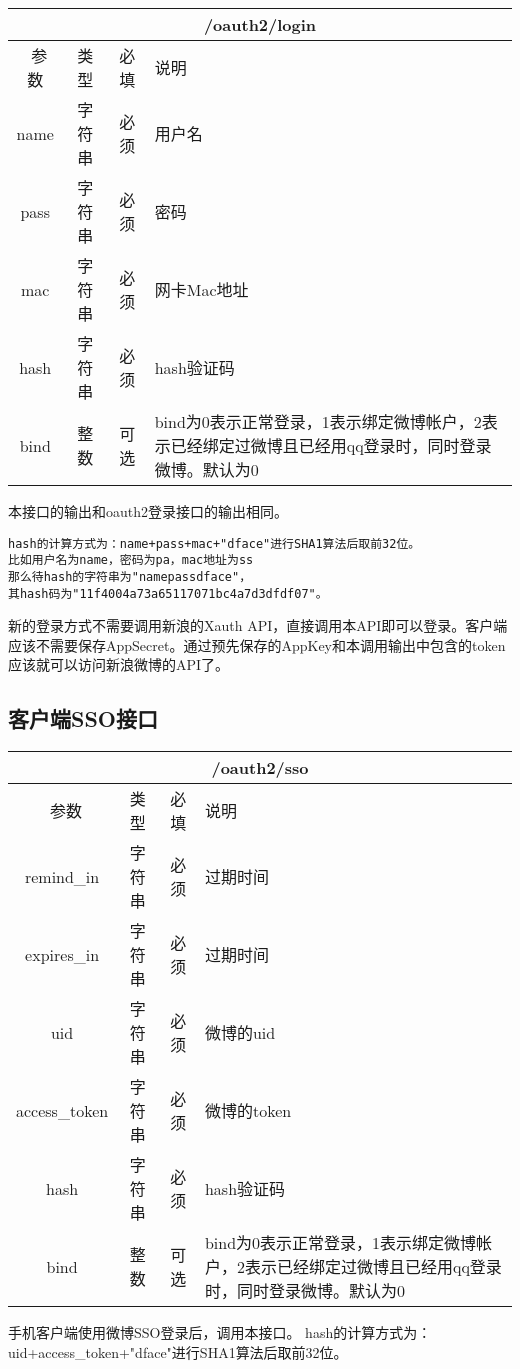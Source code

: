 \begin{table}[H]
   \begin{center}
\begin{tabular}{|c|c|c|p{12cm}|}
\hline
\multicolumn{4}{|c|}{/oauth2/login} \\
\hline\hline
 \  参数  & 类型 & 必填 &  说明  \\
\hline
 name  & 字符串 & 必须 &  用户名\\
 \hline
 pass  & 字符串 & 必须 &  密码\\
  \hline
 mac  & 字符串 & 必须 &  网卡Mac地址\\
 \hline
 hash  & 字符串 & 必须 &  hash验证码\\
\hline
 bind  & 整数 & 可选 &  bind为0表示正常登录，1表示绑定微博帐户，2表示已经绑定过微博且已经用qq登录时，同时登录微博。默认为0\\
\hline
\end{tabular}
   \end{center}
\end{table}

本接口的输出和oauth2登录接口的输出相同。

\begin{verbatim}
hash的计算方式为：name+pass+mac+"dface"进行SHA1算法后取前32位。
比如用户名为name，密码为pa，mac地址为ss
那么待hash的字符串为"namepassdface"，
其hash码为"11f4004a73a65117071bc4a7d3dfdf07"。
\end{verbatim}

新的登录方式不需要调用新浪的Xauth API，直接调用本API即可以登录。客户端应该不需要保存AppSecret。通过预先保存的AppKey和本调用输出中包含的token应该就可以访问新浪微博的API了。




\subsection{客户端SSO接口}
\label{hash_algorithm}

\begin{table}[H]
   \begin{center}
\begin{tabular}{|c|c|c|p{12cm}|}
\hline
\multicolumn{4}{|c|}{/oauth2/sso} \\
\hline\hline
 \  参数  & 类型 & 必填 &  说明  \\
\hline
 remind\_in  & 字符串 & 必须 &  过期时间\\
 \hline
 expires\_in  & 字符串 & 必须 &  过期时间\\
  \hline
 uid  & 字符串 & 必须 &  微博的uid\\
  \hline
 access\_token  & 字符串 & 必须 &  微博的token\\
 \hline
 hash  & 字符串 & 必须 &  hash验证码\\
\hline
 bind  & 整数 & 可选 &  bind为0表示正常登录，1表示绑定微博帐户，2表示已经绑定过微博且已经用qq登录时，同时登录微博。默认为0\\
\hline
\end{tabular}
   \end{center}
\end{table}
手机客户端使用微博SSO登录后，调用本接口。
hash的计算方式为：uid+access\_token+"dface"进行SHA1算法后取前32位。


